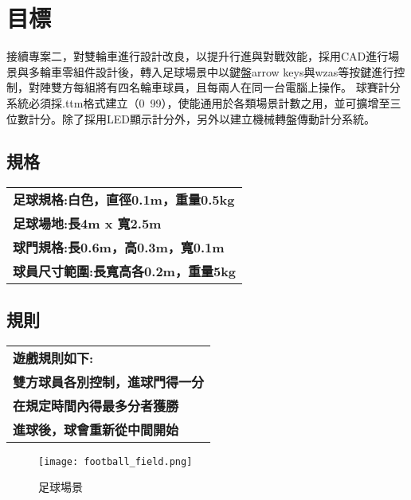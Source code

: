 \chapter{目標}
接續專案二，對雙輪車進行設計改良，以提升行進與對戰效能，採用CAD進行場景與多輪車零組件設計後，轉入足球場景中以鍵盤arrow keys與wzas等按鍵進行控制，對陣雙方每組將有四名輪車球員，且每兩人在同一台電腦上操作。
球賽計分系統必須採.ttm格式建立（0~99），使能通用於各類場景計數之用，並可擴增至三位數計分。除了採用LED顯示計分外，另外以建立機械轉盤傳動計分系統。

\section{規格}
\begin{tabular}{p{8cm}}
  \textbf{足球規格:白色，直徑0.1m，重量0.5kg} \\
  \textbf{足球場地:長4m x 寬2.5m} \\
  \textbf{球門規格:長0.6m，高0.3m，寬0.1m} \\
  \textbf{球員尺寸範圍:長寬高各0.2m，重量5kg} \\
\end{tabular}

\section{規則}
\begin{tabular}{p{8cm}}
  \textbf{遊戲規則如下:} \\
  \textbf{雙方球員各別控制，進球門得一分} \\
  \textbf{在規定時間內得最多分者獲勝} \\
  \textbf{進球後，球會重新從中間開始} \\
\end{tabular}
\begin{figure}
  \begin{center}
    \texttt{[image: football\_field.png]}
  \end{center}
  \caption{足球場景}
  \label{fig:photo}
\end{figure}
